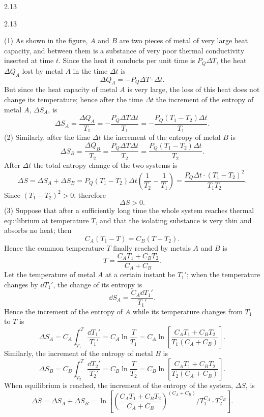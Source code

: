 \begin{solution}{2.13}
\begin{figbox}{2.13}
\end{figbox}

(1) As shown in the figure, $A$ and $B$ are two pieces of metal of very large heat capacity, and between them is a substance of very poor thermal conductivity inserted at time $t$. Since the heat it conducts per unit time is $P_Q\Delta T$, the heat $\Delta Q_A$ lost by metal $A$ in the time $\Delta t$ is
\[
\Delta Q_A=-P_Q\Delta T\cdot\Delta t.
\]
But since the heat capacity of metal $A$ is very large, the loss of this heat does not change its temperature; hence after the time $\Delta t$ the increment of the entropy of metal $A$, $\Delta S_A$, is
\[
\Delta S_A=\frac{\Delta Q_A}{T_1}=-\frac{P_Q\Delta T\Delta t}{T_1}=-\frac{P_Q(T_1-T_2)\Delta t}{T_1}.
\]
(2) Similarly, after the time $\Delta t$ the increment of the entropy of metal $B$ is
\[
\Delta S_B=\frac{\Delta Q_B}{T_2}=\frac{P_Q\Delta T\Delta t}{T_2}=\frac{P_Q(T_1-T_2)\Delta t}{T_2}.
\]
After $\Delta t$ the total entropy change of the two systems is
\[
\Delta S=\Delta S_A+\Delta S_B=P_Q(T_1-T_2)\Delta t\left(\frac{1}{T_2}-\frac{1}{T_1}\right)=\frac{P_Q\Delta t\cdot(T_1-T_2)^2}{T_1T_2}.
\]
Since $(T_1-T_2)^2>0$, therefore
\[
\Delta S>0.
\]
(3) Suppose that after a sufficiently long time the whole system reaches thermal equilibrium at temperature $T$, and that the isolating substance is very thin and absorbs no heat; then
\[
C_A(T_1-T)=C_B(T-T_2).
\]
Hence the common temperature $T$ finally reached by metals $A$ and $B$ is
\[
T=\frac{C_AT_1+C_BT_2}{C_A+C_B}.
\]
Let the temperature of metal $A$ at a certain instant be $T_1'$; when the temperature changes by $\dd T_1'$, the change of its entropy is
\[
\dd S_A=\frac{C_A\dd T_1'}{T_1'}.
\]
Hence the increment of the entropy of $A$ while its temperature changes from $T_1$ to $T$ is
\[
\Delta S_A=C_A\int_{T_1}^{T}\frac{\dd T_1'}{T_1'}=C_A\ln\frac{T}{T_1}
=C_A\ln\left[\frac{C_AT_1+C_BT_2}{T_1(C_A+C_B)}\right].
\]
Similarly, the increment of the entropy of metal $B$ is
\[
\Delta S_B=C_B\int_{T_2}^{T}\frac{\dd T_2'}{T_2'}=C_B\ln\frac{T}{T_2}
=C_B\ln\left[\frac{C_AT_1+C_BT_2}{T_2(C_A+C_B)}\right].
\]
When equilibrium is reached, the increment of the entropy of the system, $\Delta S$, is
\[
\Delta S=\Delta S_A+\Delta S_B
=\ln\left[\left(\frac{C_AT_1+C_BT_2}{C_A+C_B}\right)^{(C_A+C_B)}\Big/T_1^{C_A}\cdot T_2^{C_B}\right].
\]
\end{solution}

